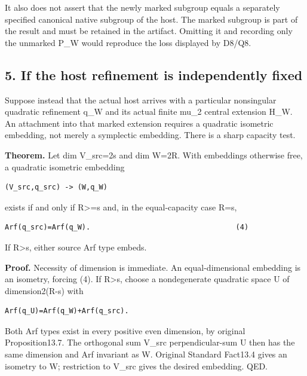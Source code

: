 It also does not assert that the newly marked subgroup equals a
separately specified canonical native subgroup of the host. The marked
subgroup is part of the result and must be retained in the artifact.
Omitting it and recording only the unmarked P\_W would reproduce the
loss displayed by D8/Q8.

\hypertarget{dyadic_markings-if-the-host-refinement-is-independently-fixed}{%
\subsection{5. If the host refinement is independently
fixed}\label{dyadic_markings-if-the-host-refinement-is-independently-fixed}}

Suppose instead that the actual host arrives with a particular
nonsingular quadratic refinement q\_W and its actual finite mu\_2
central extension H\_W. An attachment into that marked extension
requires a quadratic isometric embedding, not merely a symplectic
embedding. There is a sharp capacity test.

\textbf{Theorem.} Let dim V\_src=2s and dim W=2R. With embeddings
otherwise free, a quadratic isometric embedding

\begin{Verbatim}[fontsize=\small,breaklines=true,breakanywhere=true]
(V_src,q_src) -> (W,q_W)
\end{Verbatim}

exists if and only if R\textgreater=s and, in the equal-capacity case
R=s,

\begin{Verbatim}[fontsize=\small,breaklines=true,breakanywhere=true]
Arf(q_src)=Arf(q_W).                                  (4)
\end{Verbatim}

If R\textgreater s, either source Arf type embeds.

\textbf{Proof.} Necessity of dimension is immediate. An
equal-dimensional embedding is an isometry, forcing (4). If
R\textgreater s, choose a nondegenerate quadratic space U of
dimension2(R-s) with

\begin{Verbatim}[fontsize=\small,breaklines=true,breakanywhere=true]
Arf(q_U)=Arf(q_W)+Arf(q_src).
\end{Verbatim}

Both Arf types exist in every positive even dimension, by original
Proposition13.7. The orthogonal sum V\_src perpendicular-sum U then has
the same dimension and Arf invariant as W. Original Standard Fact13.4
gives an isometry to W; restriction to V\_src gives the desired
embedding. QED.

